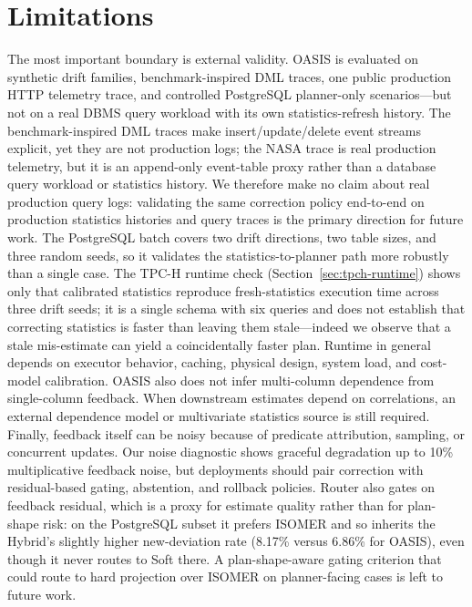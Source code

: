 \documentclass[preprint,12pt]{elsarticle}
\begin{document}
\section{Limitations}
\label{sec:limitations}

The most important boundary is external validity. OASIS is evaluated on synthetic
drift families, benchmark-inspired DML traces, one public production HTTP
telemetry trace, and controlled PostgreSQL planner-only scenarios---but not on a
real DBMS query workload with its own statistics-refresh history. The
benchmark-inspired DML traces make insert/update/delete event streams explicit,
yet they are not production logs; the NASA trace is real production telemetry, but
it is an append-only event-table proxy rather than a database query workload or
statistics history. We therefore make no claim about real production query logs:
validating the same correction policy end-to-end on production statistics
histories and query traces is the primary direction for future work. The PostgreSQL
batch covers two drift directions, two table sizes, and three random seeds, so
it validates the statistics-to-planner path more robustly than a single case.
The TPC-H runtime check (Section~\ref{sec:tpch-runtime}) shows only that
calibrated statistics reproduce fresh-statistics execution time across three drift
seeds; it is a single schema with six queries and does not establish that
correcting statistics is faster than leaving them stale---indeed we observe that a
stale mis-estimate can yield a coincidentally faster plan. Runtime in
general depends on executor
behavior, caching, physical design, system load, and cost-model calibration. OASIS also does not infer multi-column dependence from
single-column feedback. When downstream estimates depend on correlations, an
external dependence model or multivariate statistics source is still required.
Finally, feedback itself can be noisy because of predicate attribution,
sampling, or concurrent updates. Our noise diagnostic shows graceful
degradation up to 10\% multiplicative feedback noise, but deployments should
pair correction with residual-based gating, abstention, and rollback policies.
Router also gates on feedback residual, which is a proxy for
estimate quality rather than for plan-shape risk: on the PostgreSQL subset it
prefers ISOMER and so inherits the Hybrid's slightly higher new-deviation rate
(8.17\% versus 6.86\% for OASIS), even though it never routes to
Soft there. A plan-shape-aware gating criterion that could route to
hard projection over ISOMER on planner-facing cases is left to future work.
\end{document}
